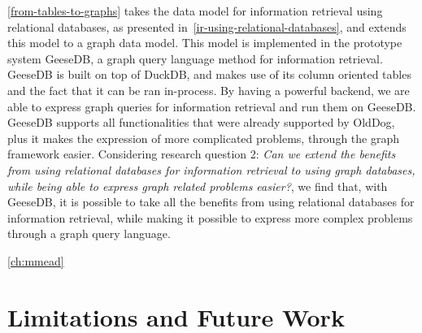 \cref{from-tables-to-graphs} takes the data model for information retrieval using relational databases, as presented in~\cref{ir-using-relational-databases}, and extends this model to a graph data model. This model is implemented in the prototype system GeeseDB, a graph query language method for information retrieval. GeeseDB is built on top of DuckDB, and makes use of its column oriented tables and the fact that it can be ran in-process. By having a powerful backend, we are able to express graph queries for information retrieval and run them on GeeseDB. GeeseDB supports all functionalities that were already supported by OldDog, plus it makes the expression of more complicated problems, through the graph framework easier. Considering research question 2: \emph{Can we extend the benefits from using relational databases for information retrieval to using graph databases, while being able to express graph related problems easier?}, we find that, with GeeseDB, it is possible to take all the benefits from using relational databases for information retrieval, while making it possible to express more complex problems through a graph query language.

\cref{ch:mmead}


\section{Limitations and Future Work}
